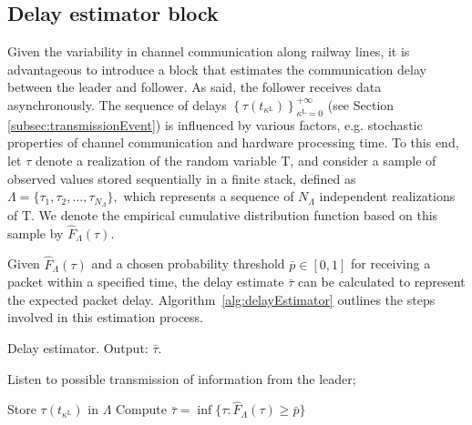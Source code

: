 \documentclass[letterpaper, 10 pt, conference]{ieeeconf}
\theoremstyle{definition}
\theoremstyle{nopoint}
\newcommand{\tildeAdd}{~}
\begin{document}
\subsection{Delay estimator block}
\label{subsec:delayEstimator}  


Given the variability in channel communication along railway lines, it is advantageous to introduce a block that estimates the communication delay between the leader and follower. As said, the follower receives data asynchronously. The sequence of delays $ \left\{ \tau(t_{\kappa^\mathrm{L}})\right\}_{\kappa^\mathrm{L}=0}^{+\infty}$ (see Section \ref{subsec:transmissionEvent}) is influenced by various factors, e.g. stochastic properties of channel communication and hardware processing time. To this end, let \( \tau \) denote a realization of the random variable \( \mathrm{T} \), and consider a sample of observed values stored sequentially in a finite stack, defined as \( \Lambda = \{\tau_1, \tau_2, \dots, \tau_{N_\Lambda}\},\) which represents a sequence of \( N_\Lambda \) independent realizations of \( \mathrm{T} \). We denote the empirical cumulative distribution function based on this sample by \( \hat{F}_\Lambda(\tau) \).



Given \( \hat{F}_\Lambda(\tau) \) and a chosen probability threshold \( \bar{p} \in [0,1] \) for receiving a packet within a specified time, the delay estimate \( \bar{\tau} \) can be calculated to represent the expected packet delay.
 Algorithm\tildeAdd\ref{alg:delayEstimator} outlines the steps involved in this estimation process.

\begin{algorithm}
	\caption{Delay estimator. Output: $\bar{\tau}$. }\label{alg:delayEstimator}
	\begin{algorithmic}[1]
		\Loop
		
		\State Listen to possible transmission of information from the leader;
		
		
		
		\State Store $\tau(t_{\kappa^\mathrm{L}})$ in $\Lambda$
		\State Compute $\bar{\tau} = \inf \{ \tau : \hat{F}_\Lambda(\tau) \geq \bar{p} \}
		$  
		
		
		\EndIf
		
		
		
		\EndLoop
		
	\end{algorithmic}
\end{algorithm}
\end{document}
